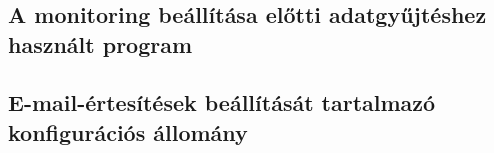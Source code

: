 \appendix
\chapter*{\fuggelek}
\setcounter{chapter}{\appendixnumber}
\label{cha:appendix}
\linespread{1}

\section{A monitoring beállítása előtti adatgyűjtéshez használt program}



\clearpage\section{E-mail-értesítések beállítását tartalmazó konfigurációs állomány}

